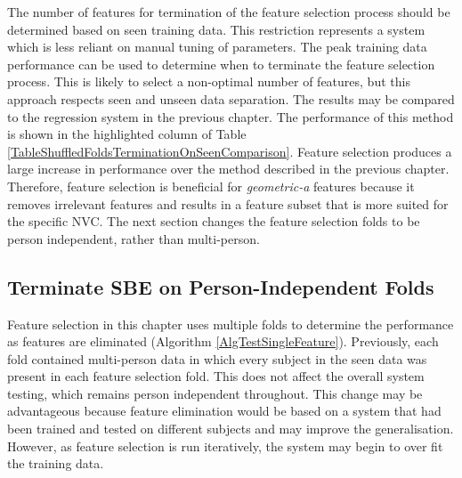 The number of features for termination of the feature selection process should be determined based on seen training data. This restriction represents a system which is less reliant on manual tuning of parameters. The peak training data performance can be used to determine when to terminate the feature selection process. This is likely to select a non-optimal number of features, but this approach respects seen and unseen data separation. The results may be compared to the regression system in the previous chapter. The performance of this method is shown in the highlighted column of Table \ref{TableShuffledFoldsTerminationOnSeenComparison}. Feature selection produces a large increase in performance over the method described in the previous chapter. Therefore, feature selection is beneficial for \textit{geometric-a} features because it removes irrelevant features and results in a feature subset that is more suited for the specific \ac{NVC}. The next section changes the feature selection folds to be person independent, rather than multi-person.

\subsection{Terminate \acs{SBE} on Person-Independent Folds}
\label{SectionPersonIndependentFeatureSelection}

Feature selection in this chapter uses multiple folds to determine the performance as features are eliminated (Algorithm \ref{AlgTestSingleFeature}). Previously, each fold contained multi-person data in which every subject in the seen data was present in each feature selection fold. This does not affect the overall system testing, which remains person independent throughout. This change may be advantageous because feature elimination would be based on a system that had been trained and tested on different subjects and may improve the generalisation. However, as feature selection is run iteratively, the system may begin to over fit the training data.

